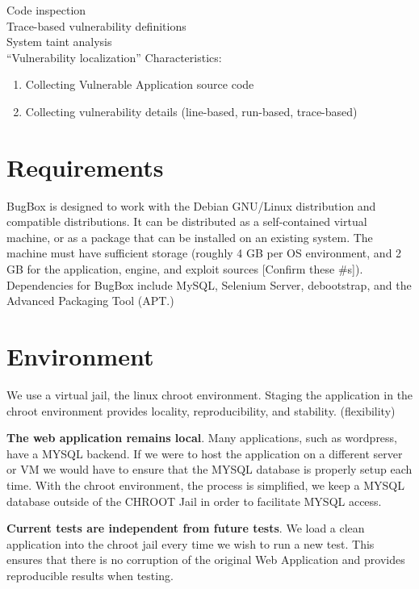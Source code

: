 \documentclass[letterpaper,twocolumn,10pt]{article}
\begin{document}
\noindent Code inspection\\
Trace-based vulnerability definitions\\
System taint analysis\\

\noindent ``Vulnerability localization'' Characteristics:
 \begin{enumerate} 
	\item Collecting Vulnerable Application source code
	\item Collecting vulnerability details (line-based, run-based, trace-based)
 \end{enumerate}

\section{Requirements}

BugBox is designed to work with the Debian GNU/Linux distribution and compatible distributions.  It can be distributed as a self-contained virtual machine, or as a package that can be installed on an existing system. The machine must have sufficient storage (roughly 4 GB per OS environment, and 2 GB for the application, engine, and exploit sources [Confirm these \#s]).  Dependencies for BugBox include MySQL,  Selenium Server, debootstrap, and the Advanced Packaging Tool (APT.)\par

\section{Environment}

We use a virtual jail, the linux chroot environment.  Staging the application in the chroot environment provides locality, reproducibility, and stability.  (flexibility)

{\bf The web application remains local}.  Many applications, such as wordpress, have a MYSQL backend.  If we were to host the application on a different server or VM we would have to ensure that the MYSQL database is properly setup each time.  With the chroot environment, the process is simplified, we keep a MYSQL database outside of the CHROOT Jail in order to facilitate MYSQL access.  

{\bf Current tests are independent from future tests}.  We load a clean application into the chroot jail every time we wish to run a new test.  This ensures that there is no corruption of the original Web Application and provides reproducible results when testing.
\end{document}
